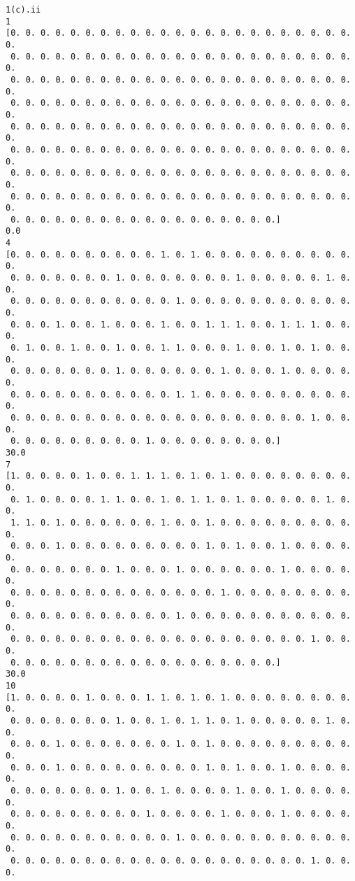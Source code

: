 \documentclass[11pt]{article}
\begin{document}
    \begin{Verbatim}[commandchars=\\\{\}]
1(c).ii
1
[0. 0. 0. 0. 0. 0. 0. 0. 0. 0. 0. 0. 0. 0. 0. 0. 0. 0. 0. 0. 0. 0. 0. 0.
 0. 0. 0. 0. 0. 0. 0. 0. 0. 0. 0. 0. 0. 0. 0. 0. 0. 0. 0. 0. 0. 0. 0. 0.
 0. 0. 0. 0. 0. 0. 0. 0. 0. 0. 0. 0. 0. 0. 0. 0. 0. 0. 0. 0. 0. 0. 0. 0.
 0. 0. 0. 0. 0. 0. 0. 0. 0. 0. 0. 0. 0. 0. 0. 0. 0. 0. 0. 0. 0. 0. 0. 0.
 0. 0. 0. 0. 0. 0. 0. 0. 0. 0. 0. 0. 0. 0. 0. 0. 0. 0. 0. 0. 0. 0. 0. 0.
 0. 0. 0. 0. 0. 0. 0. 0. 0. 0. 0. 0. 0. 0. 0. 0. 0. 0. 0. 0. 0. 0. 0. 0.
 0. 0. 0. 0. 0. 0. 0. 0. 0. 0. 0. 0. 0. 0. 0. 0. 0. 0. 0. 0. 0. 0. 0. 0.
 0. 0. 0. 0. 0. 0. 0. 0. 0. 0. 0. 0. 0. 0. 0. 0. 0. 0. 0. 0. 0. 0. 0. 0.
 0. 0. 0. 0. 0. 0. 0. 0. 0. 0. 0. 0. 0. 0. 0. 0. 0. 0.]
0.0
4
[0. 0. 0. 0. 0. 0. 0. 0. 0. 0. 1. 0. 1. 0. 0. 0. 0. 0. 0. 0. 0. 0. 0. 0.
 0. 0. 0. 0. 0. 0. 0. 1. 0. 0. 0. 0. 0. 0. 0. 1. 0. 0. 0. 0. 0. 1. 0. 0.
 0. 0. 0. 0. 0. 0. 0. 0. 0. 0. 0. 1. 0. 0. 0. 0. 0. 0. 0. 0. 0. 0. 0. 0.
 0. 0. 0. 1. 0. 0. 1. 0. 0. 0. 1. 0. 0. 1. 1. 1. 0. 0. 1. 1. 1. 0. 0. 0.
 0. 1. 0. 0. 1. 0. 0. 1. 0. 0. 1. 1. 0. 0. 0. 1. 0. 0. 1. 0. 1. 0. 0. 0.
 0. 0. 0. 0. 0. 0. 0. 1. 0. 0. 0. 0. 0. 0. 1. 0. 0. 0. 1. 0. 0. 0. 0. 0.
 0. 0. 0. 0. 0. 0. 0. 0. 0. 0. 0. 1. 1. 0. 0. 0. 0. 0. 0. 0. 0. 0. 0. 0.
 0. 0. 0. 0. 0. 0. 0. 0. 0. 0. 0. 0. 0. 0. 0. 0. 0. 0. 0. 0. 1. 0. 0. 0.
 0. 0. 0. 0. 0. 0. 0. 0. 0. 1. 0. 0. 0. 0. 0. 0. 0. 0.]
30.0
7
[1. 0. 0. 0. 0. 1. 0. 0. 1. 1. 1. 0. 1. 0. 1. 0. 0. 0. 0. 0. 0. 0. 0. 0.
 0. 1. 0. 0. 0. 0. 1. 1. 0. 0. 1. 0. 1. 1. 0. 1. 0. 0. 0. 0. 0. 1. 0. 0.
 1. 1. 0. 1. 0. 0. 0. 0. 0. 0. 1. 0. 0. 1. 0. 0. 0. 0. 0. 0. 0. 0. 0. 0.
 0. 0. 0. 1. 0. 0. 0. 0. 0. 0. 0. 0. 0. 1. 0. 1. 0. 0. 1. 0. 0. 0. 0. 0.
 0. 0. 0. 0. 0. 0. 0. 1. 0. 0. 0. 1. 0. 0. 0. 0. 0. 0. 1. 0. 0. 0. 0. 0.
 0. 0. 0. 0. 0. 0. 0. 0. 0. 0. 0. 0. 0. 0. 1. 0. 0. 0. 0. 0. 0. 0. 0. 0.
 0. 0. 0. 0. 0. 0. 0. 0. 0. 0. 0. 1. 0. 0. 0. 0. 0. 0. 0. 0. 0. 0. 0. 0.
 0. 0. 0. 0. 0. 0. 0. 0. 0. 0. 0. 0. 0. 0. 0. 0. 0. 0. 0. 0. 1. 0. 0. 0.
 0. 0. 0. 0. 0. 0. 0. 0. 0. 0. 0. 0. 0. 0. 0. 0. 0. 0.]
30.0
10
[1. 0. 0. 0. 0. 1. 0. 0. 0. 1. 1. 0. 1. 0. 1. 0. 0. 0. 0. 0. 0. 0. 0. 0.
 0. 0. 0. 0. 0. 0. 0. 1. 0. 0. 1. 0. 1. 1. 0. 1. 0. 0. 0. 0. 0. 1. 0. 0.
 0. 0. 0. 1. 0. 0. 0. 0. 0. 0. 0. 1. 0. 1. 0. 0. 0. 0. 0. 0. 0. 0. 0. 0.
 0. 0. 0. 1. 0. 0. 0. 0. 0. 0. 0. 0. 0. 1. 0. 1. 0. 0. 1. 0. 0. 0. 0. 0.
 0. 0. 0. 0. 0. 0. 0. 1. 0. 0. 1. 0. 0. 0. 0. 1. 0. 0. 1. 0. 0. 0. 0. 0.
 0. 0. 0. 0. 0. 0. 0. 0. 0. 1. 0. 0. 0. 0. 1. 0. 0. 0. 1. 0. 0. 0. 0. 0.
 0. 0. 0. 0. 0. 0. 0. 0. 0. 0. 0. 1. 0. 0. 0. 0. 0. 0. 0. 0. 0. 0. 0. 0.
 0. 0. 0. 0. 0. 0. 0. 0. 0. 0. 0. 0. 0. 0. 0. 0. 0. 0. 0. 0. 1. 0. 0. 0.

\end{Verbatim}
\end{document}
